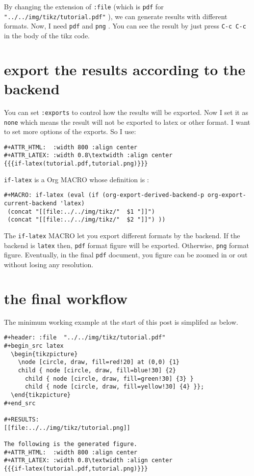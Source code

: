 \documentclass[koma,a4paper,utopia,10pt,listings-color,microtype,paralist,colorlinks]{org-article}
\begin{document}
By changing the extension of \texttt{:file} (which is \texttt{pdf} for
\texttt{"../../img/tikz/tutorial.pdf"} ), we can generate results with different formats.
Now, I need \texttt{pdf} and \texttt{png} . You can see the result by just press \texttt{C-c C-c} in the
body of the tikz code.
\section{export the results according to the backend}
\label{sec:org8166ca3}


You can set \texttt{:exports} to control how the results will be exported. Now I set it
as \texttt{none} which means the result will not be exported to latex or other format. I
want to set more options of the exports. So I use:

\begin{verbatim}
#+ATTR_HTML:  :width 800 :align center
#+ATTR_LATEX: :width 0.8\textwidth :align center
{{{if-latex(tutorial.pdf,tutorial.png)}}}
\end{verbatim}

\texttt{if-latex} is a Org MACRO whose definition is :
\begin{verbatim}
#+MACRO: if-latex (eval (if (org-export-derived-backend-p org-export-current-backend 'latex)
 (concat "[[file:../../img/tikz/"  $1 "]]")
 (concat "[[file:../../img/tikz/"  $2 "]]") ))
\end{verbatim}

The \texttt{if-latex} MACRO let you export different formats by the backend. If the
backend is \texttt{latex} then, \texttt{pdf} format figure will be exported. Otherwise, \texttt{png} format
figure. Eventually, in the final \texttt{pdf} document, you figure can be zoomed in or
out without losing any resolution.

\section{the final workflow}
\label{sec:org6fc731d}


The minimum working example at the start of this post is simplifed as below.

\begin{verbatim}
#+header: :file  "../../img/tikz/tutorial.pdf"
#+begin_src latex
  \begin{tikzpicture}
    \node [circle, draw, fill=red!20] at (0,0) {1}
    child { node [circle, draw, fill=blue!30] {2}
      child { node [circle, draw, fill=green!30] {3} }
      child { node [circle, draw, fill=yellow!30] {4} }};
  \end{tikzpicture}
#+end_src

#+RESULTS:
[[file:../../img/tikz/tutorial.png]]

The following is the generated figure.
#+ATTR_HTML:  :width 800 :align center
#+ATTR_LATEX: :width 0.8\textwidth :align center
{{{if-latex(tutorial.pdf,tutorial.png)}}}
\end{verbatim}
\end{document}
